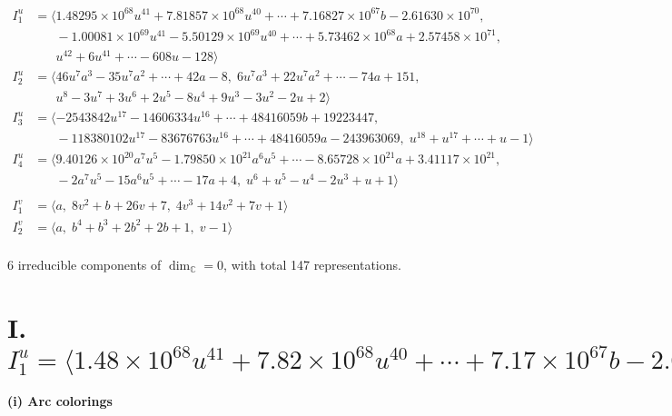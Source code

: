 \documentclass[1p]{elsarticle_modified}
\theoremstyle{definition}
\begin{document}
\begin{align*}
I^u_{1}&=\langle 
1.48295\times10^{68} u^{41}+7.81857\times10^{68} u^{40}+\cdots+7.16827\times10^{67} b-2.61630\times10^{70},\\
\phantom{I^u_{1}}&\phantom{= \langle  }-1.00081\times10^{69} u^{41}-5.50129\times10^{69} u^{40}+\cdots+5.73462\times10^{68} a+2.57458\times10^{71},\\
\phantom{I^u_{1}}&\phantom{= \langle  }u^{42}+6 u^{41}+\cdots-608 u-128\rangle \\
I^u_{2}&=\langle 
46 u^7 a^3-35 u^7 a^2+\cdots+42 a-8,\;6 u^7 a^3+22 u^7 a^2+\cdots-74 a+151,\\
\phantom{I^u_{2}}&\phantom{= \langle  }u^8-3 u^7+3 u^6+2 u^5-8 u^4+9 u^3-3 u^2-2 u+2\rangle \\
I^u_{3}&=\langle 
-2543842 u^{17}-14606334 u^{16}+\cdots+48416059 b+19223447,\\
\phantom{I^u_{3}}&\phantom{= \langle  }-118380102 u^{17}-83676763 u^{16}+\cdots+48416059 a-243963069,\;u^{18}+u^{17}+\cdots+u-1\rangle \\
I^u_{4}&=\langle 
9.40126\times10^{20} a^{7} u^{5}-1.79850\times10^{21} a^{6} u^{5}+\cdots-8.65728\times10^{21} a+3.41117\times10^{21},\\
\phantom{I^u_{4}}&\phantom{= \langle  }-2 a^7 u^5-15 a^6 u^5+\cdots-17 a+4,\;u^6+u^5- u^4-2 u^3+u+1\rangle \\
\\
I^v_{1}&=\langle 
a,\;8 v^2+b+26 v+7,\;4 v^3+14 v^2+7 v+1\rangle \\
I^v_{2}&=\langle 
a,\;b^4+b^3+2 b^2+2 b+1,\;v-1\rangle \\
\end{align*}
\raggedright * 6 irreducible components of $\dim_{\mathbb{C}}=0$, with total 147 representations.\\
\newpage
\renewcommand{\arraystretch}{1}
\centering \section*{I. $I^u_{1}= \langle 1.48\times10^{68} u^{41}+7.82\times10^{68} u^{40}+\cdots+7.17\times10^{67} b-2.62\times10^{70},\;-1.00\times10^{69} u^{41}-5.50\times10^{69} u^{40}+\cdots+5.73\times10^{68} a+2.57\times10^{71},\;u^{42}+6 u^{41}+\cdots-608 u-128 \rangle$}
\flushleft \textbf{(i) Arc colorings}\\
\end{document}
